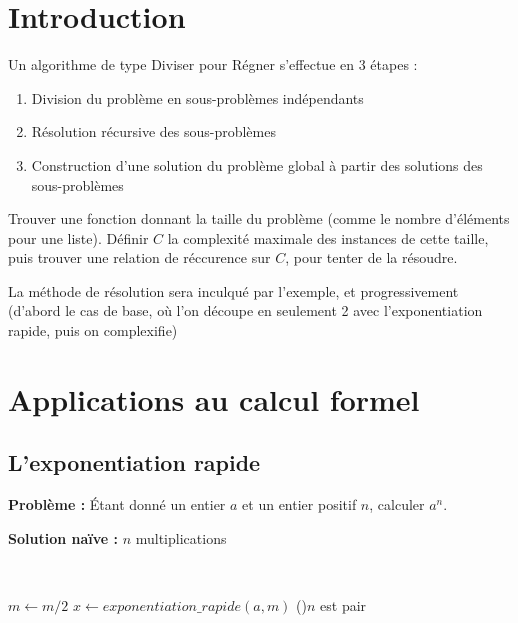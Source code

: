 
\section{Introduction}

\begin{definition}Un algorithme de type Diviser pour Régner s'effectue en 3 étapes : \begin{enumerate}
		\item Division du problème en sous-problèmes indépendants
		\item Résolution récursive des sous-problèmes
		\item Construction d'une solution du problème global à partir des solutions des sous-problèmes
\end{enumerate}
	
\end{definition}

\begin{principe}
	
	Trouver une fonction donnant la taille du problème (comme le nombre d'éléments pour une liste). Définir $C$ la complexité maximale des instances de cette taille, puis trouver une relation de réccurence sur $C$, pour tenter de la résoudre.
	
\end{principe}

\begin{com}
	La méthode de résolution sera inculqué par l'exemple, et progressivement (d'abord le cas de base, où l'on découpe en seulement 2 avec l'exponentiation rapide, puis on complexifie)
\end{com}

\section{Applications au calcul formel}

\subsection{L'exponentiation rapide}

\textbf{Problème :} Étant donné un entier $a$ et un entier positif $n$, calculer $a^n$.

\textbf{Solution naïve :} $n$ multiplications

\begin{algo}[Méthode D\&R] \enspace \\
	\begin{minipage}{0.7\linewidth}
		\begin{algorithm}[H]
			\caption{$exponentiation\_rapide(a, n)$}
				{}
			$m \gets m/2$ 
			$x \gets exponentiation\_rapide(a, m)$ 
			\eSi(){$n$ est pair}
				{}
				{}
		\end{algorithm}
	\end{minipage}
\end{algo}

